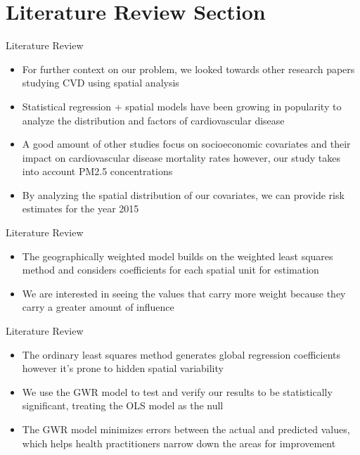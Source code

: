 \documentclass[
  ignorenonframetext,
]{beamer}
\begin{document}
\section{Literature Review Section}\label{literature-review-section}

\begin{frame}{Literature Review}
\label{literature-review}
\begin{itemize}
\item
  For further context on our problem, we looked towards other research
  papers studying CVD using spatial analysis
\item
  Statistical regression + spatial models have been growing in
  popularity to analyze the distribution and factors of cardiovascular
  disease~
\item
  A good amount of other studies focus on socioeconomic covariates and
  their impact on cardiovascular disease mortality rates however, our
  study takes into account PM2.5 concentrations~
\item
  By analyzing the spatial distribution of our covariates, we can
  provide risk estimates for the year 2015
\end{itemize}
\end{frame}

\begin{frame}{Literature Review}
\label{literature-review-1}
\begin{itemize}
\item
  The geographically weighted model builds on the weighted least squares
  method and considers coefficients for each spatial unit for
  estimation~
\item
  We are interested in seeing the values that carry more weight because
  they carry a greater amount of influence
\end{itemize}
\end{frame}

\begin{frame}{Literature Review}
\label{literature-review-2}
\begin{itemize}
\item
  The ordinary least squares method generates global regression
  coefficients however it's prone to hidden spatial variability~
\item
  We use the GWR model to test and verify our results to be
  statistically significant, treating the OLS model as the null~
\item
  The GWR model minimizes errors between the actual and predicted
  values, which helps health practitioners narrow down the areas for
  improvement
\end{itemize}
\end{frame}
\end{document}
